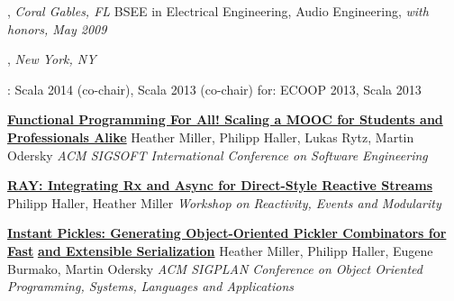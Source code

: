 \documentclass[9pt]{article}
\begin{document}
, \emph{Coral Gables, FL} \vspace{0.01in}  
\newline\noindent BSEE in Electrical Engineering, Audio Engineering, {\em with honors, May 2009}
\medskip

, \emph{New York, NY} \vspace{0.01in}  
\bigskip


: Scala 2014 (co-chair), Scala 2013 (co-chair)
\newline{} for: ECOOP 2013, Scala 2013

\bigskip

\medskip


\noindent\href{http://infoscience.epfl.ch/record/190022}{\bf Functional Programming For All! Scaling a MOOC for Students and Professionals Alike}
\newline\noindent Heather Miller, Philipp Haller, Lukas Rytz, Martin Odersky
\newline\noindent\emph{ACM SIGSOFT International Conference on Software Engineering}
\medskip

\noindent\href{http://infoscience.epfl.ch/record/188383}{\bf RAY: Integrating Rx and Async for Direct-Style Reactive Streams}
\newline\noindent Philipp Haller, Heather Miller
\newline\noindent\emph{Workshop on Reactivity, Events and Modularity}
\medskip

\noindent\href{http://infoscience.epfl.ch/record/188383}{\bf Instant Pickles: Generating Object-Oriented Pickler Combinators for Fast}\vspace{-0.03in}
\newline\noindent\href{http://infoscience.epfl.ch/record/188383}{\bf and Extensible Serialization}
\newline\noindent Heather Miller, Philipp Haller, Eugene Burmako, Martin Odersky
\newline\noindent\emph{ACM SIGPLAN Conference on Object Oriented Programming, Systems,}
\newline\noindent\emph{Languages and Applications}
\medskip
\end{document}
